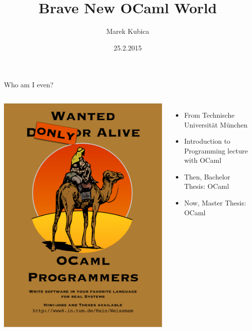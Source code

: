 \documentclass{beamer}
\title{Brave New OCaml World}
\author{Marek Kubica}
\institute{Lambda Days}
\date{25.2.2015}
\begin{document}
\maketitle

\begin{frame}{Who am I even?}
  \begin{columns}[c]
      \includegraphics[height=0.8\textheight]{programmers}
      \begin{itemize}
        \item From Technische Universität München
        \item Introduction to Programming lecture with OCaml
        \item Then, Bachelor Thesis: OCaml
        \item Now, Master Thesis: OCaml
      \end{itemize}
  \end{columns}
\end{frame}
\end{document}
